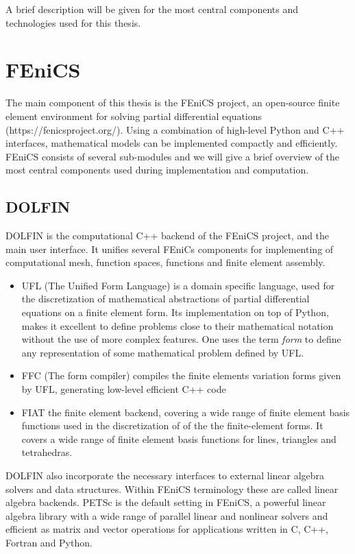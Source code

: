 A brief description will be given for the most central components and technologies used for this thesis. 
\section{FEniCS}
The main component of this thesis is the FEniCS project, an open-source finite element environment for solving partial differential equations (https://fenicsproject.org/). Using a combination of high-level Python and C++ interfaces, mathematical models can be implemented compactly and efficiently. FEniCS consists of several sub-modules and we will give a brief overview of the most central components used during implementation and computation.

\subsection{DOLFIN}
DOLFIN is the computational C++ backend of the FEniCS project, and the main user interface. It unifies several FEniCs components for implementing of computational mesh, function spaces, functions and finite element assembly. 

\begin{itemize} 
\item UFL (The Unified Form Language)  is a domain specific language, used for the discretization of mathematical abstractions of partial differential equations on a finite element form. Its implementation on top of Python, makes it excellent to define problems close to their mathematical notation without the use of more complex features. One uses the term \textit{form} to define any representation of some mathematical problem defined by UFL.   

\item FFC (The form compiler) compiles the finite elements variation forms given by UFL, generating low-level efficient C++ code 

\item FIAT the finite element backend, covering a wide range of finite element basis functions used in the discretization of of the  the finite-element forms. It covers a wide range of finite element basis functions for lines, triangles and tetrahedras.

\end{itemize}  


DOLFIN also incorporate the necessary interfaces to external linear algebra solvers and data structures. Within FEniCS terminology these are called linear algebra backends. PETSc is the default setting in FEniCS, a powerful linear algebra library
with a wide range of parallel linear and nonlinear solvers and efficient as matrix and vector operations for applications written in C, C++, Fortran and Python.
\newpage

